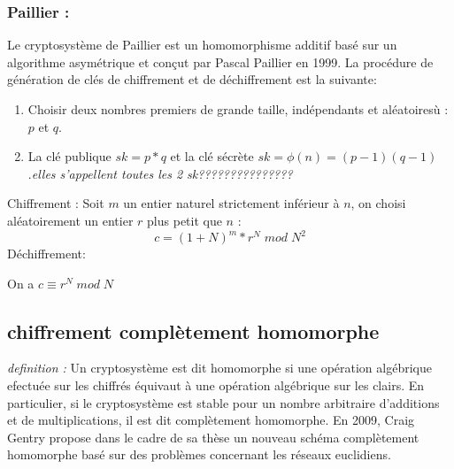 \documentclass[a4paper,12pt]{report}
\begin{document}
\subsubsection{Paillier : }

Le cryptosystème de Paillier est un homomorphisme additif basé sur un algorithme asymétrique et conçut par Pascal Paillier en 1999.\newline
La procédure de génération de clés de chiffrement et de déchiffrement est la suivante:
\begin{enumerate}
\item Choisir deux nombres premiers de grande taille, indépendants et aléatoiresù : $p$   et $q$.
\item La clé publique $sk = p*q$ et la clé sécrète $sk = \phi(n) = (p - 1)(q -1)$.\textit{elles s'appellent toutes les 2 sk???????????????}
\end{enumerate}
Chiffrement :\newline
Soit $m$ un entier naturel strictement inférieur à $n$, on choisi aléatoirement un entier $r$ plus petit que $n$ :\newline
$$c = (1+N)^m * r^N\;mod\; N^2$$
Déchiffrement:\newline

On a $c \equiv r^N\;mod\; N$
\subsection{chiffrement complètement homomorphe}
\textit{definition :}
Un cryptosystème est dit homomorphe si une opération algébrique efectuée sur les chiffrés équivaut à une opération algébrique sur les clairs. En particulier, si le cryptosystème est stable pour un nombre arbitraire d'additions et de multiplications, il est dit complètement homomorphe.\newline
En 2009, Craig Gentry propose dans le cadre de sa thèse un nouveau schéma complètement homomorphe basé sur des problèmes concernant les réseaux euclidiens.
\end{document}
